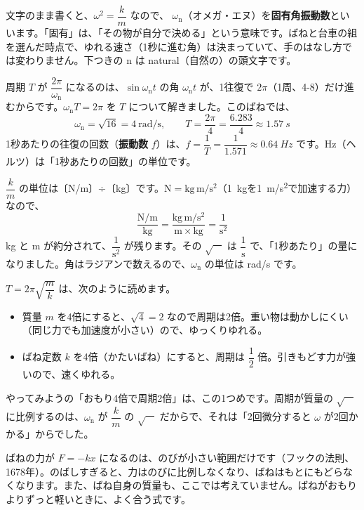 文字のまま書くと、$\omega^2=\dfrac{k}{m}$ なので、
$\omega_{\mathrm n}$（オメガ・エヌ）を\textbf{固有角振動数}といいます。「固有」は、「その物が自分で決める」という意味です。ばねと台車の組を選んだ時点で、ゆれる速さ（1秒に進む角）は決まっていて、手のはなし方では変わりません。下つきの n は natural（自然の）の頭文字です。

周期 $T$ が $\dfrac{2\pi}{\omega_{\mathrm n}}$ になるのは、$\sin\omega_{\mathrm n}t$ の角 $\omega_{\mathrm n}t$ が、1往復で $2\pi$（1周、4-8）だけ進むからです。$\omega_{\mathrm n}T=2\pi$ を $T$ について解きました。このばねでは、
\[ \omega_{\mathrm n}=\sqrt{16}=4\ \mathrm{rad/s},\qquad T=\frac{2\pi}{4}=\frac{6.283}{4}\approx\qty{1.57}{s} \]
1秒あたりの往復の回数（\textbf{振動数} $f$）は、$f=\dfrac{1}{T}=\dfrac{1}{1.571}\approx\qty{0.64}{Hz}$ です。Hz（ヘルツ）は「1秒あたりの回数」の単位です。

$\dfrac{k}{m}$ の単位は〔N/m〕÷〔kg〕です。$\mathrm{N}=\mathrm{kg\,m/s^2}$（\qty{1}{kg}を\qty{1}{m/s^2}で加速する力）なので、
\[ \frac{\mathrm{N/m}}{\mathrm{kg}}=\frac{\mathrm{kg\,m/s^2}}{\mathrm{m}\times\mathrm{kg}}=\frac{1}{\mathrm{s^2}} \]
kg と m が約分されて、$\dfrac{1}{\mathrm{s^2}}$ が残ります。その $\sqrt{\phantom{m}}$ は $\dfrac{1}{\mathrm s}$ で、「1秒あたり」の量になりました。角はラジアンで数えるので、$\omega_{\mathrm n}$ の単位は rad/s です。

$T=2\pi\sqrt{\dfrac{m}{k}}$ は、次のように読めます。
\begin{itemize}[leftmargin=1.2\zw, itemsep=2pt, topsep=2pt, label={\color{\bkTT}●}]
\item 質量 $m$ を4倍にすると、$\sqrt4=2$ なので周期は2倍。重い物は動かしにくい（同じ力でも加速度が小さい）ので、ゆっくりゆれる。
\item ばね定数 $k$ を4倍（かたいばね）にすると、周期は $\dfrac{1}{2}$ 倍。引きもどす力が強いので、速くゆれる。
\end{itemize}
やってみようの「おもり4倍で周期2倍」は、この1つめです。周期が質量の $\sqrt{\phantom{m}}$ に比例するのは、$\omega_{\mathrm n}$ が $\dfrac{k}{m}$ の $\sqrt{\phantom{m}}$ だからで、それは「2回微分すると $\omega$ が2回かかる」からでした。

\begin{seikaku}
ばねの力が $F=-kx$ になるのは、のびが小さい範囲だけです（フックの法則、1678年）。のばしすぎると、力はのびに比例しなくなり、ばねはもとにもどらなくなります。また、ばね自身の質量も、ここでは考えていません。ばねがおもりよりずっと軽いときに、よく合う式です。
\end{seikaku}

